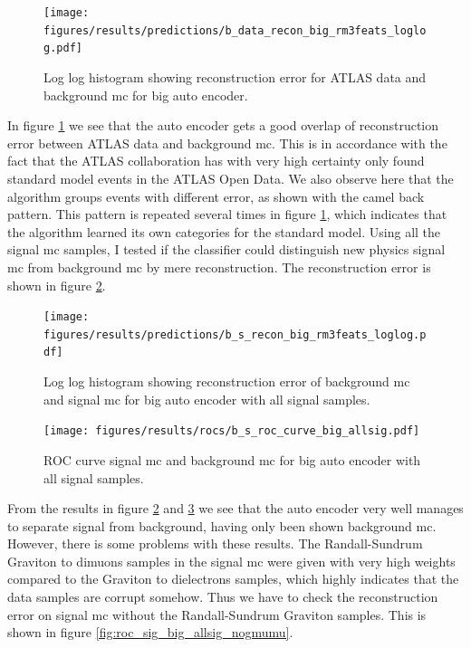 \documentclass[ reprint, amsmath,amssymb, aps, nofootinbib]{revtex4-2}
\begin{document}
\begin{figure}[H]
     \centering
         \texttt{[image: figures/results/predictions/b\_data\_recon\_big\_rm3feats\_loglog.pdf]}
         \caption{Log log histogram showing reconstruction error for ATLAS data and background mc for big auto encoder. }
     \label{fig:data_b_big_pred}
\end{figure}

In figure \ref{fig:data_b_big_pred} we see that the auto encoder gets a good overlap of reconstruction error between ATLAS data and background mc. This is in accordance with the fact that the ATLAS collaboration has with very high certainty only found standard model events in the ATLAS Open Data. We also observe here that the algorithm groups events with different error, as shown with the camel back pattern. This pattern is repeated several times in figure \ref{fig:data_b_big_pred}, which indicates that the algorithm learned its own categories for the standard model. Using all the signal mc samples, I tested if the classifier could distinguish new physics signal mc from background mc by mere reconstruction. The reconstruction error is shown in figure \ref{fig:s_b_big_pred_allsig}.


\begin{figure}[H]
     \centering
         \texttt{[image: figures/results/predictions/b\_s\_recon\_big\_rm3feats\_loglog.pdf]}
    \caption{Log log histogram showing reconstruction error of background mc and signal mc for big auto encoder with all signal samples.  }
    \label{fig:s_b_big_pred_allsig}
\end{figure}


\begin{figure}[H]    
    
    \centering
         \texttt{[image: figures/results/rocs/b\_s\_roc\_curve\_big\_allsig.pdf]}
         \caption{ROC curve signal mc and background mc for big auto encoder with all signal samples.}
         \label{fig:s_b_big_roc_allsig}
\end{figure}


From the results in figure \ref{fig:s_b_big_pred_allsig} and \ref{fig:s_b_big_roc_allsig} we see that the auto encoder very well manages to separate signal from background, having only been shown background mc. However, there is some problems with these results. The Randall-Sundrum Graviton to dimuons samples in the signal mc were given with very high weights compared to the Graviton to dielectrons samples, which highly indicates that the data samples are corrupt somehow. Thus we have to check the reconstruction error on signal mc without the Randall-Sundrum Graviton samples. This is shown in figure \ref{fig:roc_sig_big_allsig_nogmumu}.
\end{document}
